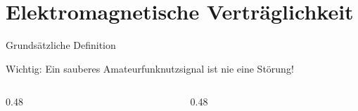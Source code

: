 
\section{Elektromagnetische Verträglichkeit}
\label{section:elektromagnetische_vertraeglichkeit}

\begin{frame}{Grundsätzliche Definition}
    \begin{alertblock}{Wichtig:}
        Ein sauberes Amateurfunknutzsignal ist nie eine Störung!
    \end{alertblock}


    \begin{columns}[T]
        \begin{column}{0.48\linewidth}
        \end{column}
        \begin{column}{0.48\linewidth}

        \end{column}
    \end{columns}
\end{frame}

